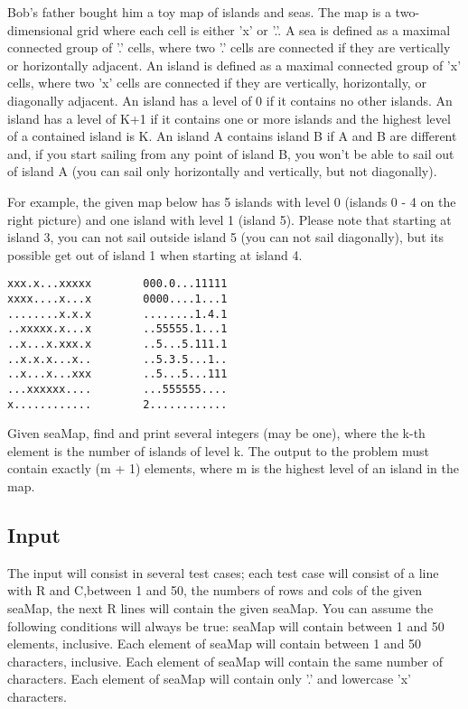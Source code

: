Bob's father bought him a toy map of islands and seas. The map is a two-dimensional grid where each cell is either 'x' or '.'. A sea is defined as a maximal connected group of '.' cells, where two '.' cells are connected if they are vertically or horizontally adjacent. An island is defined as a maximal connected group of 'x' cells, where two 'x' cells are connected if they are vertically, horizontally, or diagonally adjacent. An island has a level of 0 if it contains no other islands. An island has a level of K+1 if it contains one or more islands and the highest level of a contained island is K. An island A contains island B if A and B are different and, if you start sailing from any point of island B, you won't be able to sail out of island A (you can sail only horizontally and vertically, but not diagonally).

For example, the given map below has 5 islands with level 0 (islands 0 - 4 on the right picture) and one island with level 1 (island 5). Please note that starting at island 3, you can not sail outside island 5 (you can not sail diagonally), but its possible get out of island 1 when starting at island 4.

\begin{verbatim}
xxx.x...xxxxx        000.0...11111
xxxx....x...x        0000....1...1
........x.x.x        ........1.4.1
..xxxxx.x...x        ..55555.1...1
..x...x.xxx.x        ..5...5.111.1
..x.x.x...x..        ..5.3.5...1..
..x...x...xxx        ..5...5...111
...xxxxxx....        ...555555....
x............        2............
\end{verbatim}

Given seaMap, find and print several integers (may be one), where the k-th element is the number of islands of level k. The output to the problem must contain exactly (m + 1) elements, where m is the highest level of an island in the map.

\subsection* {Input}

The input will consist in several test cases; each test case will consist of a line with R and C,between 1 and 50, the numbers of rows and cols of the given seaMap, the next R lines will contain the given seaMap. You can assume the following conditions will always be true:
seaMap will contain between 1 and 50 elements, inclusive.
Each element of seaMap will contain between 1 and 50 characters, inclusive.
Each element of seaMap will contain the same number of characters.
Each element of seaMap will contain only '.' and lowercase 'x' characters.

